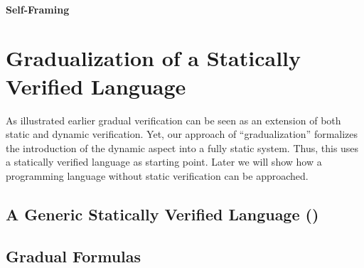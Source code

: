 \subsubsection{Self-Framing}





\chapter{Gradualization of a Statically Verified Language}

As illustrated earlier %
gradual verification can be seen as an extension of both static and dynamic verification.
Yet, our approach of “gradualization” formalizes the introduction of the dynamic aspect into a fully static system.
Thus, this %
uses a statically verified language as starting point.
Later %
we will show how a programming language without static verification can be approached.



\section{A Generic Statically Verified Language (\gsvl)}
\label{sec:a-statically-verified}


\section{Gradual Formulas}

